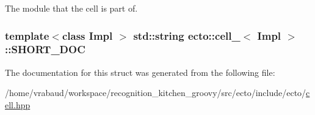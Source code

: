 \-The module that the cell is part of. 

\hypertarget{structecto_1_1cell___a6a5b6bd083a48acd35ffcf83dacff2f1}{
\subsubsection[{\-S\-H\-O\-R\-T\-\_\-\-D\-O\-C}]{\setlength{\rightskip}{0pt plus 5cm}template$<$class Impl $>$ std\-::string {\bf ecto\-::cell\-\_\-}$<$ \-Impl $>$\-::{\bf \-S\-H\-O\-R\-T\-\_\-\-D\-O\-C}}}\label{structecto_1_1cell___a6a5b6bd083a48acd35ffcf83dacff2f1}


\-The documentation for this struct was generated from the following file\-:\begin{DoxyCompactItemize}
\item 
/home/vrabaud/workspace/recognition\-\_\-kitchen\-\_\-groovy/src/ecto/include/ecto/\hyperlink{cell_8hpp}{cell.\-hpp}\end{DoxyCompactItemize}

